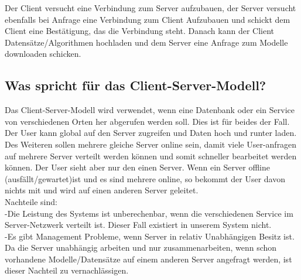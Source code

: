 Der Client versucht eine Verbindung zum Server aufzubauen, der Server versucht ebenfalls bei Anfrage eine Verbindung zum Client Aufzubauen und schickt dem Client eine Bestätigung, das die Verbindung steht. Danach kann der Client Datensätze/Algorithmen hochladen und dem Server eine Anfrage zum Modelle downloaden schicken.

\subsection*{Was spricht für das Client-Server-Modell?}
Das Client-Server-Modell wird verwendet, wenn eine Datenbank oder ein Service von verschiedenen Orten her abgerufen werden soll. Dies ist für beides der Fall. Der User kann global auf den Server zugreifen und Daten hoch und runter laden.\\
Des Weiteren sollen mehrere gleiche Server online sein, damit viele User-anfragen auf mehrere Server verteilt werden können und somit schneller bearbeitet werden können. Der User sieht aber nur den einen Server. Wenn ein Server offline (ausfällt/gewartet)ist und es sind mehrere online, so bekommt der User davon nichts mit und wird auf einen anderen Server geleitet.\\
Nachteile sind:\\
-Die Leistung des Systems ist unberechenbar, wenn die verschiedenen Service im Server-Netzwerk verteilt ist. Dieser Fall existiert in unserem System nicht.\\
-Es gibt Management Probleme, wenn Server in relativ Unabhängigen Besitz ist. Da die Server unabhängig arbeiten und nur zusammenarbeiten, wenn schon vorhandene Modelle/Datensätze auf einem anderen Server angefragt werden, ist dieser Nachteil zu vernachlässigen.





%